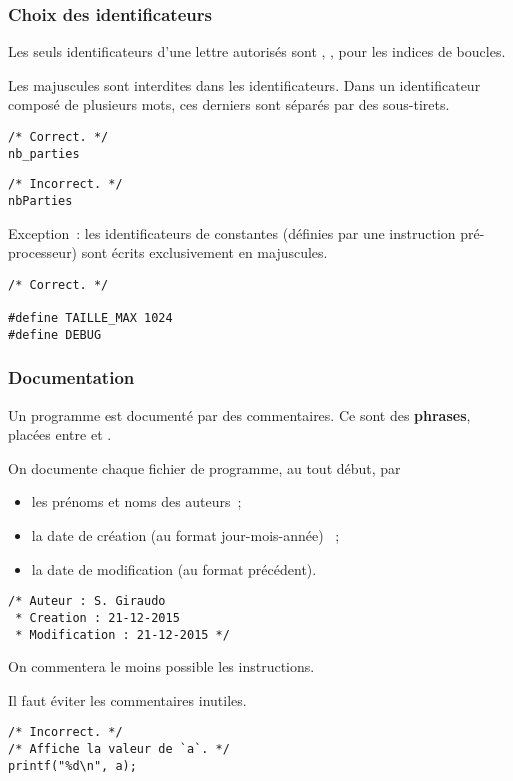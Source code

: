 \begin{frame}[fragile] \frametitle{Choix des identificateurs}
Les seuls identificateurs d'une lettre autorisés sont ,
,  pour les indices de boucles.
\medskip

Les majuscules sont interdites dans les identificateurs. Dans un
identificateur composé de plusieurs mots, ces derniers sont séparés par 
des sous-tirets.

\begin{multicols}{2}
\begin{lstlisting}
/* Correct. */
nb_parties
\end{lstlisting}

\begin{lstlisting}
/* Incorrect. */
nbParties
\end{lstlisting}
\end{multicols}

Exception~: les identificateurs de constantes (définies par une 
instruction pré-processeur) sont écrits exclusivement en majuscules.
\begin{lstlisting}
/* Correct. */

#define TAILLE_MAX 1024
#define DEBUG
\end{lstlisting}
\end{frame}

\begin{frame}[fragile] \frametitle{Documentation}
Un programme est documenté par des \alert{commentaires}. Ce sont des 
{\bf phrases}, placées entre \Code{/*} et \Code{*/}.
\medskip

On documente chaque \alert{fichier de programme}, au tout début, par

\begin{itemize}
    \item les prénoms et noms des auteurs~;
    \smallskip
    
    \item la date de création (au format jour-mois-année) ~;
    \smallskip
    
    \item la date de modification (au format précédent).
\end{itemize}

\begin{lstlisting}
/* Auteur : S. Giraudo
 * Creation : 21-12-2015
 * Modification : 21-12-2015 */
\end{lstlisting}
\bigskip

On commentera le moins possible les instructions.
\smallskip

Il faut éviter les commentaires inutiles.
\begin{lstlisting}
/* Incorrect. */
/* Affiche la valeur de `a`. */
printf("%d\n", a); 
\end{lstlisting}
\end{frame}

